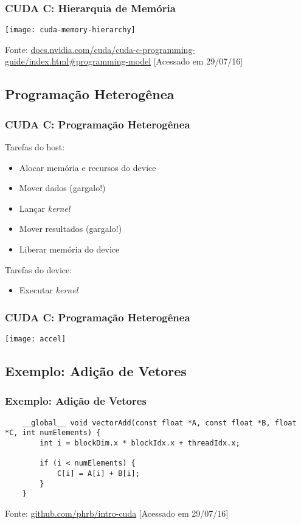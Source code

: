 \documentclass[10pt, compress]{beamer}
\begin{document}
\begin{frame}
    \frametitle{CUDA C: Hierarquia de Memória}
    \begin{center}
        \texttt{[image: cuda-memory-hierarchy]}
    \end{center}

    \vfill

    \begin{center}
        \tiny{Fonte: \url{docs.nvidia.com/cuda/cuda-c-programming-guide/index.html\#programming-model} [Acessado em 29/07/16]}
    \end{center}
\end{frame}

\subsection{Programação Heterogênea}

\begin{frame}
    \frametitle{CUDA C: Programação Heterogênea}
    Tarefas do \alert{host}:
    \begin{itemize}
        \item Alocar memória e recursos do \alert{device}
        \item Mover \alert{dados} (\alert{gargalo!})
        \item Lançar \textit{kernel}
        \item Mover \alert{resultados} (\alert{gargalo!})
        \item Liberar memória do \alert{device}
    \end{itemize}
    Tarefas do \alert{device}:
    \begin{itemize}
        \item Executar \textit{kernel}
    \end{itemize}
\end{frame}

\begin{frame}
    \frametitle{CUDA C: Programação Heterogênea}
    \centering
    \texttt{[image: accel]}
\end{frame}

\subsection{Exemplo: Adição de Vetores}

\begin{frame}[fragile]
    \frametitle{Exemplo: Adição de Vetores}
    \begin{lstlisting}
    __global__ void vectorAdd(const float *A, const float *B, float *C, int numElements) {
        int i = blockDim.x * blockIdx.x + threadIdx.x;

        if (i < numElements) {
            C[i] = A[i] + B[i];
        }
    }
    \end{lstlisting}

    \vfill

    \begin{center}
        \tiny{Fonte: \url{github.com/phrb/intro-cuda} [Acessado em 29/07/16]}
    \end{center}
\end{frame}
\end{document}
